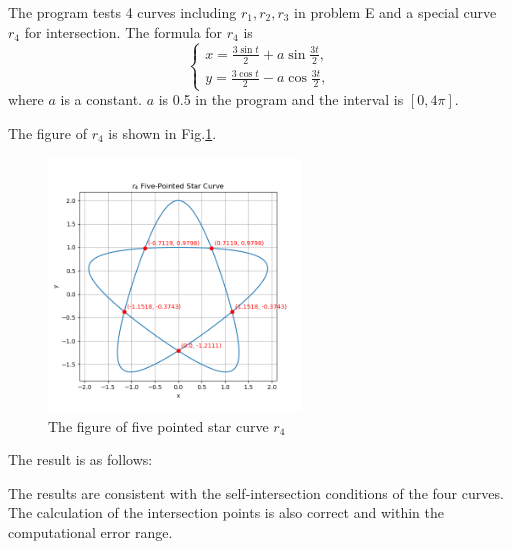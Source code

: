 \documentclass[a4paper]{article}
\begin{document}
\begin{sloppypar}
The program tests 4 curves including $r_1,r_2,r_3$ in problem E and a special curve $r_4$ for intersection. 
The formula for $r_4$ is 
$$
\begin{cases}
  x=\frac{3\sin t}{2}+a\sin\frac{3t}{2},\\
  y=\frac{3\cos t}{2}-a\cos\frac{3t}{2},
\end{cases}
$$
where $a$ is a constant. $a$ is 0.5 in the program and the interval is $[0,4\pi]$.

The figure of $r_4$ is shown in Fig.\ref{fig:r4_curve}.

\begin{figure}[H]
  \centering
  \includegraphics[width=0.6\textwidth]{../figure/intersect/five_pointed_star_curve.png}
  \renewcommand{\figurename}{Fig.}
  \caption{The figure of five pointed star curve \(r_4\)}
  \label{fig:r4_curve}
\end{figure}

The result is as follows:



The results are consistent with the self-intersection conditions of the four curves. The calculation of the intersection points is also correct and within the computational error range.

\end{sloppypar}
\end{document}
